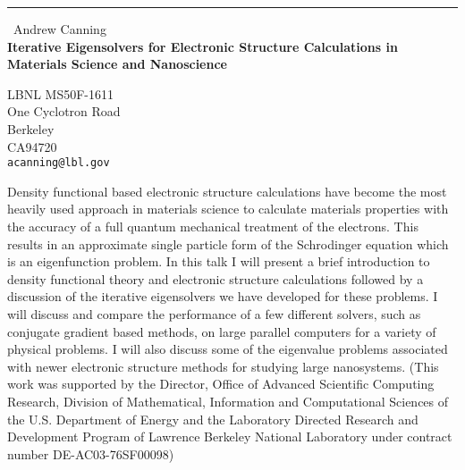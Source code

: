 \documentclass{report}
\begin{document}
\begin{center}
\rule{6in}{1pt} \
{\large Andrew Canning \\
{\bf Iterative Eigensolvers for Electronic Structure Calculations in Materials Science and Nanoscience}}

LBNL MS50F-1611 \\ One Cyclotron Road  \\ Berkeley  \\ CA94720
\\
{\tt acanning@lbl.gov}\end{center}

Density functional based electronic structure calculations
have become the most heavily used approach in materials science to
calculate materials properties with the accuracy of a full quantum
mechanical treatment of the electrons. This results in an approximate
single particle form of the Schrodinger equation which is an
eigenfunction problem.
In this talk I will present a brief introduction to density functional
theory and electronic structure calculations followed by a discussion
of the iterative eigensolvers we have developed for these problems.
I will discuss and compare the performance of a few different solvers,
such as conjugate gradient based methods,
on large parallel computers for a variety of physical problems.
I will also discuss some of the eigenvalue problems associated
with newer electronic structure methods for studying large nanosystems.
(This work was supported by the Director, Office of
Advanced Scientific Computing Research, Division of Mathematical,
Information and Computational Sciences of the U.S. Department
of Energy and the Laboratory Directed Research and Development
Program of Lawrence Berkeley National Laboratory
under contract number DE-AC03-76SF00098)
\end{document}

